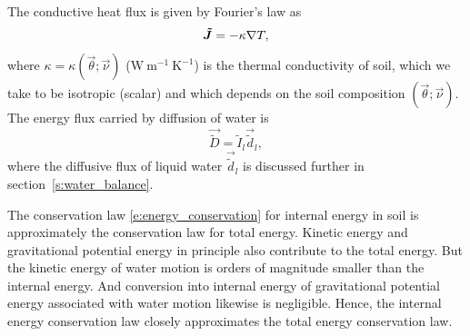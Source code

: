 \documentclass{report}
\begin{document}
The conductive heat flux is given by Fourier's law as
\begin{equation}
    \boldsymbol{{\tilde J}} = - \kappa \nabla T, 
\end{equation}
where $\kappa = \kappa(\vec{\theta}; \vec{\nu})$ ($\mathrm{W~m^{-1}~K^{-1}}$) is the thermal conductivity of soil, which we take to be isotropic (scalar) and which depends on the soil composition $(\vec{\theta}; \vec{\nu})$. The energy flux carried by diffusion of water is 
\begin{equation}
    \vec{\tilde D} = \tilde I_l \vec{\tilde d}_{l},
\end{equation}
where the diffusive flux of liquid water $\vec{\tilde d}_{l}$ is discussed further in section~\ref{s:water_balance}. 

The conservation law \eqref{e:energy_conservation} for internal energy in soil is approximately the conservation law for total energy. Kinetic energy and gravitational potential energy in principle also contribute to the total energy. But the kinetic energy of water motion is orders of magnitude smaller than the internal energy. And conversion into internal energy of gravitational potential energy associated with water motion likewise is negligible. Hence, the internal energy conservation law closely approximates the total energy conservation law. 
\end{document}
